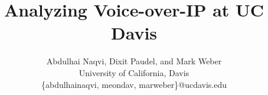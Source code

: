 \documentclass[letterpaper,twocolumn,10pt]{article}
\date{}
\begin{document}
\title{ Analyzing Voice-over-IP at UC Davis}
\author{Abdulhai Naqvi, Dixit Paudel, and Mark Weber\\
University of California, Davis\\
\{abdulhainaqvi, meondav, marweber\}@ucdavis.edu}
\maketitle

















\end{document}
